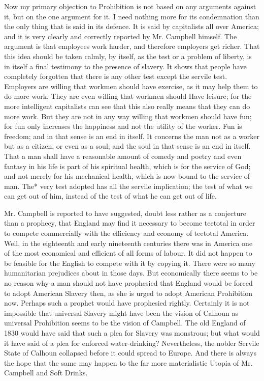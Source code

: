 \documentclass{book}
\begin{document}
Now my primary objection to Prohibition is not based on any arguments against it, but on the one argument for it. I need nothing more for its condemnation than the only thing that is said in its defence. It is said by capitalists all over America; and it is very clearly and correctly reported by Mr. Campbell himself. The argument is that employees work harder, and therefore employers get richer. That this idea should be taken calmly, by itself, as the test or a problem of liberty, is in itself a final testimony to the presence of slavery. It shows that people have completely forgotten that there is any other test except the servile test. Employers are willing that workmen should have exercise, as it may help them to do more work. They are even willing that workmen should Have leisure; for the more intelligent capitalists can see that this also really means that they can do more work. But they are not in any way willing that workmen should have fun; for fun only increases the happiness and not the utility of the worker. Fun is freedom; and in that sense is an end in itself. It concerns the man not as a worker but as a citizen, or even as a soul; and the soul in that sense is an end in itself. That a man shall have a reasonable amount of comedy and poetry and even fantasy in his life is part of his spiritual health, which is for the service of God; and not merely for his mechanical health, which is now bound to the service of man. The* very test adopted has all the servile implication; the test of what we can get out of him, instead of the test of what he can get out of life.

Mr. Campbell is reported to have suggested, doubt less rather as a conjecture than a prophecy, that England may find it necessary to become teetotal in order to compete commercially with the efficiency and economy of teetotal America. Well, in the eighteenth and early nineteenth centuries there was in America one of the most economical and efficient of all forms of labour. It did not happen to be feasible for the English to compete with it by copying it. There were so many humanitarian prejudices about in those days. But economically there seems to be no reason why a man should not have prophesied that England would be forced to adopt American Slavery then, as she is urged to adopt American Prohibition now. Perhaps such a prophet would have prophesied rightly. Certainly it is not impossible that universal Slavery might have been the vision of Calhoun as universal Prohibition seems to be the vision of Campbell. The old England of 1830 would have said that such a plea for Slavery was monstrous; but what would it have said of a plea for enforced water-drinking? Nevertheless, the nobler Servile State of Calhoun collapsed before it could spread to Europe. And there is always the hope that the same may happen to the far more materialistic Utopia of Mr. Campbell and Soft Drinks.
\end{document}

